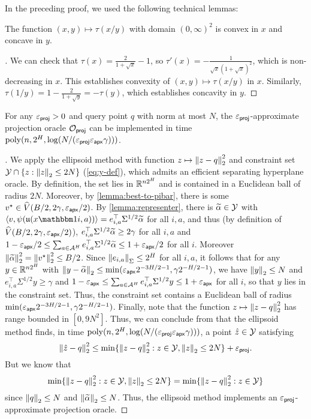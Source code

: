 In the preceding proof, we used the following technical lemmas:

\begin{lemma}\label{lemma:tau-convex-concave}
The function $(x,y) \mapsto \tau(x/y)$ with domain $(0,\infty)^2$ is convex in $x$ and concave in $y$.
\end{lemma}

\begin{proof}[]
We can check that $\tau(x) = \frac{2}{1+\sqrt{x}} - 1$, so $\tau'(x) = -\frac{1}{\sqrt{x}(1+\sqrt{x})^2}$, which is non-decreasing in $x$. This establishes convexity of $(x,y) \mapsto \tau(x/y)$ in $x$. Similarly, $\tau(1/y) = 1 - \frac{2}{1+\sqrt{y}} = -\tau(y)$, which establishes concavity in $y$.
\end{proof}

\begin{lemma}\label{lemma:projection-time}
For any $\varepsilon_{\mathsf{proj}} > 0$ and query point $q$ with norm at most $N$, the $\varepsilon_{\mathsf{proj}}$-approximate projection oracle $\mathcal{O}_{\mathsf{proj}}$ can be implemented in time $\mathrm{poly}(n,2^H, \log(N/(\varepsilon_{\mathsf{proj}}\varepsilon_{\mathsf{apx}}\gamma)))$. 
\end{lemma}

\begin{proof}[]
We apply the ellipsoid method with function $z \mapsto \left \lVert z - q \right \rVert_2^2$ and constraint set $\mathcal{Y} \cap \{z: \left \lVert z \right \rVert_2 \leq 2N\}$ (\cref{eq:y-def}), which admits an efficient separating hyperplane oracle. By definition, the set lies in $\mathbb{R}^{n2^H}$ and is contained in a Euclidean ball of radius $2N$. Moreover, by \cref{lemma:best-to-pibar}, there is some $v^\star \in \widehat{V}(B/2,2\gamma,\varepsilon_{\mathsf{apx}}/2)$. By \cref{lemma:representer}, there is $\widetilde\alpha \in \mathcal{Y}$ with $\langle v,\psi(\uop{x\ind{i}}{a})\rangle = e_{i,a}^\top \Sigma^{1/2} \alphatil$ for all $i,a$, and thus (by definition of $\widehat{V}(B/2,2\gamma,\varepsilon_{\mathsf{apx}}/2)$), $e_{i,a}^\top \Sigma^{1/2} \widetilde\alpha \geq 2\gamma$ for all $i,a$ and $1-\varepsilon_{\mathsf{apx}}/2 \leq \sum_{a \in \mathcal{A}^H} e_{i,a}^\top \Sigma^{1/2} \widetilde\alpha \leq 1+\varepsilon_{\mathsf{apx}}/2$ for all $i$. Moreover $\left \lVert \widetilde\alpha \right \rVert_2^2 = \left \lVert v^\star \right \rVert_2^2 \leq B/2$. Since $\left \lVert e_{i,a} \right \rVert_\Sigma \leq 2^H$ for all $i,a$, it follows that for any $y \in \mathbb{R}^{n2^H}$ with $\left \lVert y-\widetilde\alpha \right \rVert_2 \leq \min(\varepsilon_{\mathsf{apx}} 2^{-3H/2-1}, \gamma 2^{-H/2-1})$, we have $\left \lVert y \right \rVert_2 \leq N$ and $e_{i,a}^\top \Sigma^{1/2} y \geq \gamma$ and $1-\varepsilon_{\mathsf{apx}} \leq \sum_{a \in \mathcal{A}^H} e_{i,a}^\top \Sigma^{1/2} y \leq 1+\varepsilon_{\mathsf{apx}}$ for all $i$, so that $y$ lies in the constraint set. Thus, the constraint set contains a Euclidean ball of radius $\min(\varepsilon_{\mathsf{apx}} 2^{-3H/2-1}, \gamma 2^{-H/2-1})$. Finally, note that the function $z \mapsto \left \lVert z-q \right \rVert_2^2$ has range bounded in $[0,9N^2]$. Thus, we can conclude from \cite[Theorem 2.4]{bubeck2015convex} that the ellipsoid method finds, in time $\mathrm{poly}(n,2^H, \log(N/(\varepsilon_{\mathsf{proj}}\varepsilon_{\mathsf{apx}}\gamma)))$, a point $\hat z \in \mathcal{Y}$ satisfying 
\[\left \lVert \hat z - q \right \rVert_2^2 \leq \min\{\left \lVert z-q \right \rVert_2^2: z \in \mathcal{Y}, \left \lVert z \right \rVert_2 \leq 2N\} + \varepsilon_{\mathsf{proj}}.\]
But we know that
\[\min\{\left \lVert z-q \right \rVert_2^2: z \in \mathcal{Y}, \left \lVert z \right \rVert_2 \leq 2N\} = \min\{\left \lVert z-q \right \rVert_2^2: z \in \mathcal{Y}\}\]
since $\left \lVert q \right \rVert_2 \leq N$ and $\left \lVert \widetilde\alpha \right \rVert_2 \leq N$. Thus, the ellipsoid method implements an $\varepsilon_{\mathsf{proj}}$-approximate projection oracle.
\end{proof}


